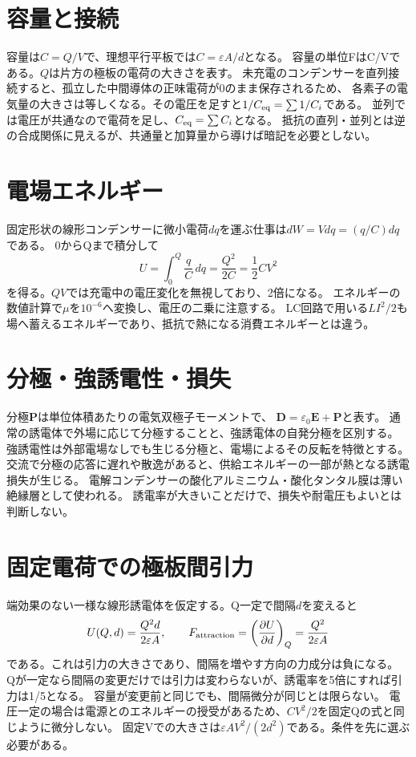 \section{容量と接続}\label{theory:em:capacitor}
容量は$C=Q/V$で、理想平行平板では$C=\varepsilon A/d$となる。
容量の単位FはC/Vである。$Q$は片方の極板の電荷の大きさを表す。
未充電のコンデンサーを直列接続すると、孤立した中間導体の正味電荷が0のまま保存されるため、
各素子の電気量の大きさは等しくなる。その電圧を足すと$1/C_{\rm eq}=\sum 1/C_i$である。
並列では電圧が共通なので電荷を足し、$C_{\rm eq}=\sum C_i$となる。
抵抗の直列・並列とは逆の合成関係に見えるが、共通量と加算量から導けば暗記を必要としない。\autocite{mit_em05}

\section{電場エネルギー}\label{theory:em:energy}
固定形状の線形コンデンサーに微小電荷$dq$を運ぶ仕事は$dW=Vdq=(q/C)dq$である。
0からQまで積分して
\[
 U=\int_0^Q\frac qC\,dq=\frac{Q^2}{2C}=\frac12CV^2
\]
を得る。$QV$では充電中の電圧変化を無視しており、2倍になる。
エネルギーの数値計算で$\mu$を$10^{-6}$へ変換し、電圧の二乗に注意する。
LC回路で用いる$LI^2/2$も場へ蓄えるエネルギーであり、抵抗で熱になる消費エネルギーとは違う。

\section{分極・強誘電性・損失}\label{theory:em:dielectric}
分極$\mathbf P$は単位体積あたりの電気双極子モーメントで、
$\mathbf D=\varepsilon_0\mathbf E+\mathbf P$と表す。
通常の誘電体で外場に応じて分極することと、強誘電体の自発分極を区別する。
強誘電性は外部電場なしでも生じる分極と、電場によるその反転を特徴とする。
交流で分極の応答に遅れや散逸があると、供給エネルギーの一部が熱となる誘電損失が生じる。
電解コンデンサーの酸化アルミニウム・酸化タンタル膜は薄い絶縁層として使われる。
誘電率が大きいことだけで、損失や耐電圧もよいとは判断しない。\autocite{mit_em05,mit_ferroelectric}

\section{固定電荷での極板間引力}\label{theory:em:force}
端効果のない一様な線形誘電体を仮定する。Q一定で間隔$d$を変えると
\[
 U(Q,d)=\frac{Q^2d}{2\varepsilon A},\qquad
 F_{\rm attraction}=\left(\frac{\partial U}{\partial d}\right)_Q
 =\frac{Q^2}{2\varepsilon A}
\]
である。これは引力の大きさであり、間隔を増やす方向の力成分は負になる。
Qが一定なら間隔の変更だけでは引力は変わらないが、誘電率を5倍にすれば引力は1/5となる。
容量が変更前と同じでも、間隔微分が同じとは限らない。
電圧一定の場合は電源とのエネルギーの授受があるため、$CV^2/2$を固定Qの式と同じように微分しない。
固定Vでの大きさは$\varepsilon AV^2/(2d^2)$である。条件を先に選ぶ必要がある。

